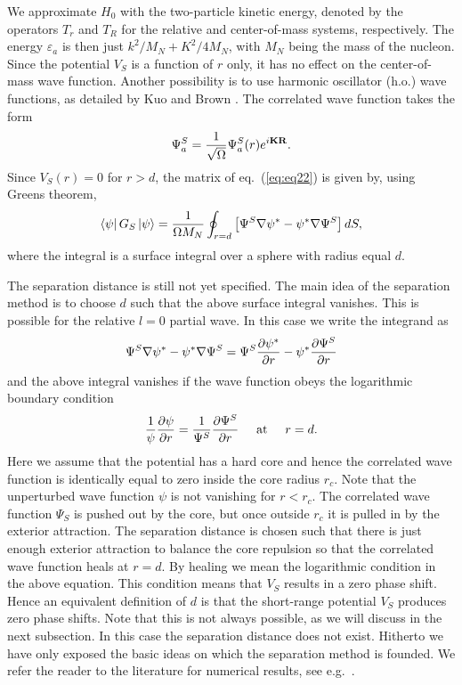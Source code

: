 We approximate $H_0$ with the two-particle kinetic energy, denoted
by the operators $T_r$ and $T_R$ for the relative and center-of-mass
systems, respectively. The energy $\varepsilon_a$ is then just
$k^2/M_N + K^2/4M_N$, with $M_N$ being the mass of the nucleon.
Since the potential $V_S$ is a function of $r$ only, it has no effect
on the center-of-mass wave function. Another possibility is to use
harmonic oscillator (h.o.) wave functions, as detailed by Kuo and
Brown \cite{kb66}.
The correlated wave function takes
the form
\begin{equation}
    \Psi_a^S
    = \frac{1}{\sqrt{\Omega}}\Psi_a^S (r)e^{i{\bf KR}}.
\end{equation}
Since $V_S(r)=0$ for $r>d$, the matrix of eq.\ (\ref{eq:eq22}) is
given by, using Greens theorem,
\begin{equation}
  \left\langle \psi \right|G_S\left| \psi \right\rangle=\frac{1}{\Omega M_N}\oint_{r=d}
   \left[\Psi^S{\bf \nabla}\psi^*-\psi^*{\bf \nabla}\Psi^S\right] dS,
\end{equation}
where the integral is a surface integral over a sphere with
radius equal $d$.

The separation distance is still not yet specified. The main
idea of the separation
method is to choose $d$ such that the above surface
integral vanishes. This is possible for the relative
$l=0$ partial wave. In this case we write the integrand as
\[
   \Psi^S{\bf \nabla}\psi^*-\psi^*{\bf \nabla}\Psi^S
   =\Psi^S\frac{\partial \psi^*}{\partial r}-
   \psi^*\frac{\partial \Psi^S}{\partial r}
\]
and the above integral vanishes if the wave function obeys
the logarithmic boundary condition
\begin{equation}
      \frac{1}{\psi}\frac{\partial \psi}{\partial r}
      = \frac{1}{\Psi^S}\frac{\partial \Psi^S}{\partial r}
      \hspace{0.5cm} \mathrm{at}\hspace{0.5cm} r=d.
\end{equation}
Here we assume that the potential has a hard core and hence the correlated
wave function is identically equal to zero inside the core radius $r_c$. 
Note that the unperturbed wave function $\psi$ is not vanishing
for $r<r_c$. The correlated wave function $\Psi_S$ is pushed out by the
core, but once outside $r_c$ it is pulled in by the exterior attraction.
The separation distance is chosen such that there is just enough 
exterior attraction to balance the core repulsion so that the correlated 
wave function heals at $r=d$. By healing we mean the logarithmic 
condition in the above equation. This condition means that $V_S$
results in a zero phase shift. Hence an equivalent definition of
$d$ is that the short-range potential $V_S$ produces zero phase shifts.
Note that this is not always possible, as we will discuss in the next
subsection. In this case the separation distance does not exist.
Hitherto we have only exposed the basic ideas on which the
separation method is founded. We refer the reader to the literature
for numerical results, see e.g.\ \cite{kb66}.


